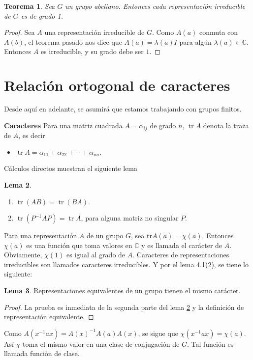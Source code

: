 \documentclass[12pt]{book}
\DeclareMathOperator{\tr}{tr}
\newtheorem{theorem}{Teorema}[section]
\theoremstyle{definition}
\newtheorem{lemma}[theorem]{Lema}
\newcounter{in}
\newcounter{ini}
\begin{document}
\begin{theorem}
  \label{t3_3}
  Sea $G$ un grupo abeliano. Entonces cada
representación irreducible de $G$ es de grado 1.
\end{theorem}

\begin{proof}
  Sea $A$ una representación irreducible de $G$. Como $A(a)$ conmuta
  con $A(b)$, el teorema pasado nos dice que $A(a)=\lambda(a) I$ para
  algún $\lambda(a) \in \mathbb{C}$. Entonces $A$ es irreducible, y su
  grado debe ser $1$.
\end{proof}

\section{Relación ortogonal de caracteres}
\label{sec:roc}
Desde aquí en adelante, se asumirá que estamos trabajando con grupos
finitos.

\textbf{Caracteres} Para una matriz cuadrada $A=\alpha_{ij}$ de grado
$n$, $\tr A$ denota la traza de $A$, es decir
\begin{itemize}
  \item $\tr A= \alpha_{11}+ \alpha_{22} + \cdots + \alpha_{nn}$.
  \end{itemize}

Cálculos directos muestran el siguiente lema

\begin{lemma}
   \label{l4_1}
  \begin{enumerate}
  \item $\tr (AB)=\tr (BA) $.
  \item $\tr (P^{-1}AP)=\tr A$, para alguna matriz no singular $P$.
  \end{enumerate}
\end{lemma}

Para una representación $A$ de un grupo $G$, sea
tr$A(a)=\chi(a)$. Entonces $\chi(a)$ es una función que toma valores
en $\mathbb{C}$ y es llamada el carácter de $A$. Obviamente, $\chi(1)$
es igual al grado de $A$. Caracteres de representaciones irreducibles
son llamados caracteres irreducibles. Y por el lema 4.1(2), se tiene
lo siguiente:

\begin{lemma}
  \label{l4_2}
  Representaciones equivalentes de un grupo tienen el mismo carácter.
\end{lemma}
\begin{proof}
  La prueba es inmediata de la segunda parte del lema \ref{l4_1} y la
  definición de representación equivalente.
\end{proof}
Como $A(x^{-1}ax)=A(x)^{-1}A(a)A(x)$, se sigue que
$ \chi(x^{-1}ax)=\chi(a)$. Así $\chi$ toma el mismo valor en una clase
de conjugación de $G$. Tal función es llamada función de clase.
\end{document}
